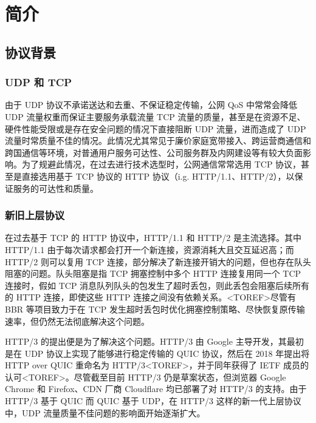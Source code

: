 

\chapter{简介}

\section{协议背景}

\subsection{UDP 和 TCP}

由于 UDP 协议不承诺送达和去重\cite{rfc768}、不保证稳定传输，公网 QoS 中常常会降低 UDP 流量权重而保证主要服务承载流量 TCP 流量的质量，甚至是在资源不足、硬件性能受限或是存在安全问题的情况下直接阻断 UDP 流量，进而造成了 UDP 流量时常质量不佳的情况。此情况尤其常见于廉价家庭宽带接入、跨运营商通信和跨国通信等环境，对普通用户服务可达性、公司服务群及内网建设等有较大负面影响。为了规避此情况，在过去进行技术选型时，公网通信常常选用 TCP 协议，甚至是直接选用基于 TCP 协议的 HTTP 协议（i.g. HTTP/1.1、HTTP/2），以保证服务的可达性和质量。

\subsection{新旧上层协议}

在过去基于 TCP 的 HTTP 协议中，HTTP/1.1 和 HTTP/2 是主流选择。其中 HTTP/1.1 由于每次请求都会打开一个新连接，资源消耗大且交互延迟高；而 HTTP/2 则可以复用 TCP 连接，部分解决了新连接开销大的问题，但也存在队头阻塞的问题。队头阻塞是指 TCP 拥塞控制中多个 HTTP 连接复用同一个 TCP 连接时，假如 TCP 消息队列队头的包发生了超时丢包，则此丢包会阻塞后续所有的 HTTP 连接，即使这些 HTTP 连接之间没有依赖关系。<TOREF>尽管有 BBR\cite{45646} 等项目致力于在 TCP 发生超时丢包时优化拥塞控制策略、尽快恢复原传输速率，但仍然无法彻底解决这个问题。

HTTP/3 的提出便是为了解决这个问题。HTTP/3 由 Google 主导开发，其最初是在 UDP 协议上实现了能够进行稳定传输的 QUIC 协议，然后在 2018 年提出将 HTTP over QUIC 重命名为 HTTP/3<TOREF>，并于同年获得了 IETF 成员的认可<TOREF>。尽管截至目前 HTTP/3 仍是草案状态\cite{ietf-quic-http-34}，但浏览器 Google Chrome 和 Firefox、CDN 厂商 Cloudflare 均已部署了对 HTTP/3 的支持。由于 HTTP/3 基于 QUIC 而 QUIC 基于 UDP，在 HTTP/3 这样的新一代上层协议中，UDP 流量质量不佳问题的影响面开始逐渐扩大。

